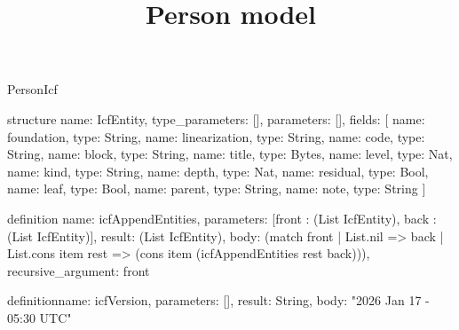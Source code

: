 \begin{lexlean}{PersonIcf}
\title{Person model}
\begin{semanticmodule}
structure{
  name: IcfEntity,
  type_parameters: [],
  parameters: [],
  fields: [
    {name: foundation, type: String},
    {name: linearization, type: String},
    {name: code, type: String},
    {name: block, type: String},
    {name: title, type: Bytes},
    {name: level, type: Nat},
    {name: kind, type: String},
    {name: depth, type: Nat},
    {name: residual, type: Bool},
    {name: leaf, type: Bool},
    {name: parent, type: String},
    {name: note, type: String}
  ]
}

definition{
  name: icfAppendEntities,
  parameters: [front : (List IcfEntity), back : (List IcfEntity)],
  result: (List IcfEntity),
  body: (match front
    | List.nil => back
    | List.cons item rest => (cons item (icfAppendEntities rest back))),
  recursive_argument: front
}

definition{name: icfVersion, parameters: [], result: String, body: "2026 Jan 17 - 05:30 UTC"}


\end{semanticmodule}
\end{lexlean}

